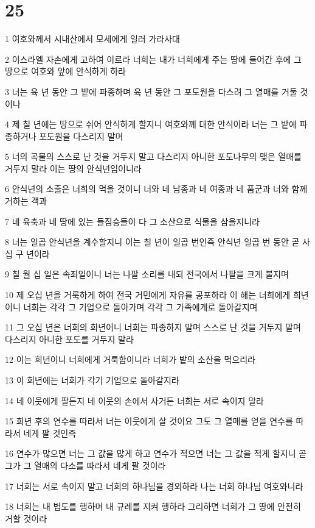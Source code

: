 \chapter{25}

\par 1 여호와께서 시내산에서 모세에게 일러 가라사대
\par 2 이스라엘 자손에게 고하여 이르라 너희는 내가 너희에게 주는 땅에 들어간 후에 그 땅으로 여호와 앞에 안식하게 하라
\par 3 너는 육 년 동안 그 밭에 파종하며 육 년 동안 그 포도원을 다스려 그 열매를 거둘 것이나
\par 4 제 칠 년에는 땅으로 쉬어 안식하게 할지니 여호와께 대한 안식이라 너는 그 밭에 파종하거나 포도원을 다스리지 말며
\par 5 너의 곡물의 스스로 난 것을 거두지 말고 다스리지 아니한 포도나무의 맺은 열매를 거두지 말라 이는 땅의 안식년임이니라
\par 6 안식년의 소출은 너희의 먹을 것이니 너와 네 남종과 네 여종과 네 품군과 너와 함께 거하는 객과
\par 7 네 육축과 네 땅에 있는 들짐승들이 다 그 소산으로 식물을 삼을지니라
\par 8 너는 일곱 안식년을 계수할지니 이는 칠 년이 일곱 번인즉 안식년 일곱 번 동안 곧 사십 구 년이라
\par 9 칠 월 십 일은 속죄일이니 너는 나팔 소리를 내되 전국에서 나팔을 크게 불지며
\par 10 제 오십 년을 거룩하게 하여 전국 거민에게 자유를 공포하라 이 해는 너희에게 희년이니 너희는 각각 그 기업으로 돌아가며 각각 그 가족에게로 돌아갈지며
\par 11 그 오십 년은 너희의 희년이니 너희는 파종하지 말며 스스로 난 것을 거두지 말며 다스리지 아니한 포도를 거두지 말라
\par 12 이는 희년이니 너희에게 거룩함이니라 너희가 밭의 소산을 먹으리라
\par 13 이 희년에는 너희가 각기 기업으로 돌아갈지라
\par 14 네 이웃에게 팔든지 네 이웃의 손에서 사거든 너희는 서로 속이지 말라
\par 15 희년 후의 연수를 따라서 너는 이웃에게 살 것이요 그도 그 열매를 얻을 연수를 따라서 네게 팔 것인즉
\par 16 연수가 많으면 너는 그 값을 많게 하고 연수가 적으면 너는 그 값을 적게 할지니 곧 그가 그 열매의 다소를 따라서 네게 팔 것이라
\par 17 너희는 서로 속이지 말고 너희의 하나님을 경외하라 나는 너희 하나님 여호와니라
\par 18 너희는 내 법도를 행하며 내 규례를 지켜 행하라 그리하면 너희가 그 땅에 안전히 거할 것이라
